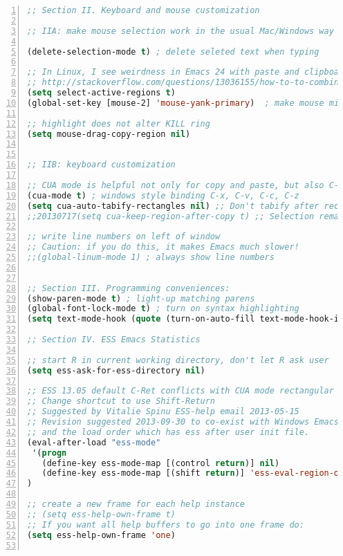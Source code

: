 \documentclass[11pt,english]{beamer}
\begin{document}
\begin{frame}
\begin{lstlisting}[basicstyle={\tiny},language=Lisp,numbers=left,numberstyle={\tiny},tabsize=2]
;; Section II. Keyboard and mouse customization

;; IIA: make mouse selection work in the usual Mac/Windows way

(delete-selection-mode t) ; delete seleted text when typing

;; In Linux, I see weirdness in Emacs 24 with paste and clipboard. Confusing!
;; http://stackoverflow.com/questions/13036155/how-to-to-combine-emacs-primary-clipboard-copy-and-paste-behavior-on-ms-windows
(setq select-active-regions t)
(global-set-key [mouse-2] 'mouse-yank-primary)  ; make mouse middle-click only paste from primary X11 selection, not clipboard and kill ring.

;; highlight does not alter KILL ring
(setq mouse-drag-copy-region nil)


;; IIB: keyboard customization

;; CUA mode is helpful not only for copy and paste, but also C-Enter is rectangle select
(cua-mode t) ; windows style binding C-x, C-v, C-c, C-z
(setq cua-auto-tabify-rectangles nil) ;; Don't tabify after rectangle commands
;;20130717(setq cua-keep-region-after-copy t) ;; Selection remains after C-c

;; write line numbers on left of window
;; Caution: if you do this, it makes Emacs much slower!
;;(global-linum-mode 1) ; always show line numbers


;; Section III. Programming conveniences:
(show-paren-mode t) ; light-up matching parens
(global-font-lock-mode t) ; turn on syntax highlighting
(setq text-mode-hook (quote (turn-on-auto-fill text-mode-hook-identify)))

;; Section IV. ESS Emacs Statistics

;; start R in current working directory, don't let R ask user
(setq ess-ask-for-ess-directory nil)

;; ESS 13.05 default C-Ret conflicts with CUA mode rectangular selection.
;; Change shortcut to use Shift-Return
;; Suggested by Vitalie Spinu ESS-help email 2013-05-15
;; Revision suggested 2013-09-30 to co-exist with Windows Emacs
;; and the load order which has ess after user init file.
(eval-after-load "ess-mode"
 '(progn
   (define-key ess-mode-map [(control return)] nil)
   (define-key ess-mode-map [(shift return)] 'ess-eval-region-or-line-and-step))
)

;; create a new frame for each help instance
;; (setq ess-help-own-frame t)
;; If you want all help buffers to go into one frame do:
(setq ess-help-own-frame 'one)


\end{lstlisting}
\end{frame}
\end{document}
